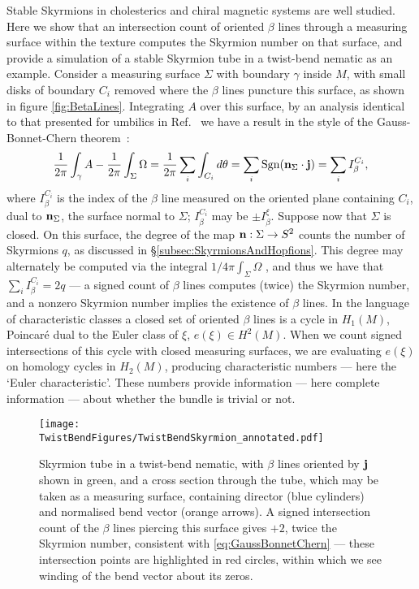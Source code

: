 {Stable Skyrmions in cholesterics \citep{Afghah2017} and chiral magnetic systems \citep{Yu2010} are well studied. Here we show that an intersection count of oriented $\beta$ lines through a measuring surface within the texture computes the Skyrmion number on that surface, and provide a simulation of a stable Skyrmion tube in a twist-bend nematic as an example. Consider a measuring surface $\Sigma$ with boundary $\gamma$ inside $M$, with small disks of boundary $C_i$ removed where the $\beta$ lines puncture this surface, as shown in figure \ref{fig:BetaLines}. Integrating $A$ over this surface, by an analysis identical to that presented for umbilics in Ref.~\citep{Machon2016b} we have a result in the style of the Gauss-Bonnet-Chern theorem~\citep{Lee1996,Frankel2015}:
\begin{equation}
    \frac{1}{2\pi}\int_\gamma A - \frac{1}{2\pi}\int_\Sigma \Omega = \frac{1}{2\pi}\sum_i \int_{C_i} d \theta = \sum_i \mathrm{Sgn}(\mathbf{n}_{\Sigma} \cdot \mathbf{j}) = \sum_i I_\beta^{C_i},
    \label{eq:GaussBonnetChern}
\end{equation}
where $I_\beta^{C_i}$ is the index of the $\beta$ line measured on the oriented plane containing $C_i$, dual to $\mathbf{n}_\Sigma$, the surface normal to $\Sigma$; $I_\beta^{C_i}$ may be $\pm I_\beta^\xi$. Suppose now that $\Sigma$ is closed. On this surface, the degree of the map $\mathbf{n} : \Sigma \rightarrow  S^2$ counts the number of Skyrmions $q$, as discussed in \S\ref{subsec:SkyrmionsAndHopfions}. This degree may alternately be computed via the integral $1/4\pi \int_\Sigma \Omega$ \citep{Frankel2015}, and thus we have that $\sum_i I_\beta^{C_i}=2q$ --- a signed count of $\beta$ lines computes (twice) the Skyrmion number, and a nonzero Skyrmion number implies the existence of $\beta$ lines. In the language of characteristic classes \citep{MilnorStasheffBook} a closed set of oriented $\beta$ lines is a cycle in $H_1(M)$, Poincar\'{e} dual to the Euler class of $\xi$, $e(\xi)\in H^2(M)$. When we count signed intersections of this cycle with closed measuring surfaces, we are evaluating $e(\xi)$ on homology cycles in $H_2(M)$, producing characteristic numbers --- here the `Euler characteristic'. These numbers provide information --- here complete information \citep{MilnorStasheffBook} --- about whether the bundle is trivial or not.
\begin{figure}[htbp]
    \centering
    \texttt{[image: \\TwistBendFigures/TwistBendSkyrmion\_annotated.pdf]}
    \caption{Skyrmion tube in a twist-bend nematic, with $\beta$ lines oriented by $\mathbf{j}$ shown in green, and a cross section through the tube, which may be taken as a measuring surface, containing director (blue cylinders) and normalised bend vector (orange arrows). A signed intersection count of the $\beta$ lines piercing this surface gives $+2$, twice the Skyrmion number, consistent with \eqref{eq:GaussBonnetChern} --- these intersection points are highlighted in red circles, within which we see winding of the bend vector about its zeros.}
    \label{fig:TwistBendSkyrmion}
\end{figure}

}
